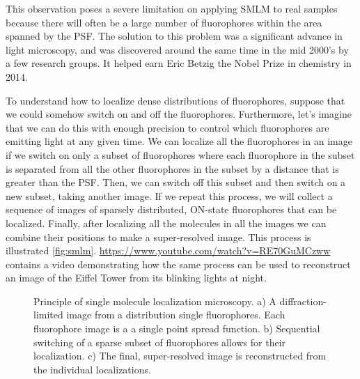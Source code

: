 \documentclass[10pt,a4paper,oneside]{book}
\begin{document}
This observation poses a severe limitation on applying SMLM to real samples because there will often be a large number of fluorophores within the area spanned by the PSF. The solution to this problem was a significant advance in light microscopy, and was discovered around the same time in the mid 2000's by a few research groups. It helped earn Eric Betzig the Nobel Prize in chemistry in 2014.

To understand how to localize dense distributions of fluorophores, suppose that we could somehow switch on and off the fluorophores. Furthermore, let's imagine that we can do this with enough precision to control which fluorophores are emitting light at any given time. We can localize all the fluorophores in an image if we switch on only a subset of fluorophores where each fluorophore in the subset is separated from all the other fluorophores in the subset by a distance that is greater than the PSF. Then, we can switch off this subset and then switch on a new subset, taking another image. If we repeat this process, we will collect a sequence of images of sparsely distributed, ON-state fluorophores that can be localized. Finally, after localizing all the molecules in all the images we can combine their positions to make a super-resolved image. This process is illustrated \autoref{fig:smlm}. \url{https://www.youtube.com/watch?v=RE70GuMCzww} contains a video demonstrating how the same process can be used to reconstruct an image of the Eiffel Tower from its blinking lights at night.

\begin{figure}
    \centering
    \caption{Principle of single molecule localization microscopy. a) A diffraction-limited image from a distribution single fluorophores. Each fluorophore image is a a single point spread function. b) Sequential switching of a sparse subset of fluorophores allows for their localization. c) The final, super-resolved image is reconstructed from the individual localizations.}
    \label{fig:smlm}
\end{figure}
\end{document}
